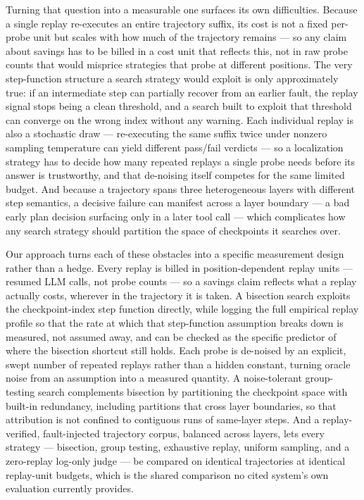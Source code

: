 \documentclass[11pt]{article}
\begin{document}
Turning that question into a measurable one surfaces its own difficulties. Because a single replay re-executes an entire trajectory suffix, its cost is not a fixed per-probe unit but scales with how much of the trajectory remains --- so any claim about savings has to be billed in a cost unit that reflects this, not in raw probe counts that would misprice strategies that probe at different positions. The very step-function structure a search strategy would exploit is only approximately true: if an intermediate step can partially recover from an earlier fault, the replay signal stops being a clean threshold, and a search built to exploit that threshold can converge on the wrong index without any warning. Each individual replay is also a stochastic draw --- re-executing the same suffix twice under nonzero sampling temperature can yield different pass/fail verdicts --- so a localization strategy has to decide how many repeated replays a single probe needs before its answer is trustworthy, and that de-noising itself competes for the same limited budget. And because a trajectory spans three heterogeneous layers with different step semantics, a decisive failure can manifest across a layer boundary --- a bad early plan decision surfacing only in a later tool call --- which complicates how any search strategy should partition the space of checkpoints it searches over.

Our approach turns each of these obstacles into a specific measurement design rather than a hedge. Every replay is billed in position-dependent replay units --- resumed LLM calls, not probe counts --- so a savings claim reflects what a replay actually costs, wherever in the trajectory it is taken. A bisection search exploits the checkpoint-index step function directly, while logging the full empirical replay profile so that the rate at which that step-function assumption breaks down is measured, not assumed away, and can be checked as the specific predictor of where the bisection shortcut still holds. Each probe is de-noised by an explicit, swept number of repeated replays rather than a hidden constant, turning oracle noise from an assumption into a measured quantity. A noise-tolerant group-testing search complements bisection by partitioning the checkpoint space with built-in redundancy, including partitions that cross layer boundaries, so that attribution is not confined to contiguous runs of same-layer steps. And a replay-verified, fault-injected trajectory corpus, balanced across layers, lets every strategy --- bisection, group testing, exhaustive replay, uniform sampling, and a zero-replay log-only judge --- be compared on identical trajectories at identical replay-unit budgets, which is the shared comparison no cited system's own evaluation currently provides.
\end{document}
